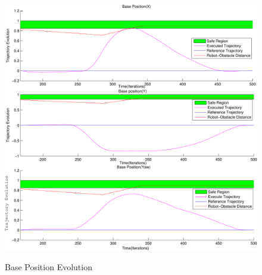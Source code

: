 \begin{figure}[!ht]
\centering
{\includegraphics[scale=0.5]{chapters/doa/images/baseplot-crop.pdf}}
\caption{Base Position Evolution}
\label{fig:basegraph}
\end{figure}




